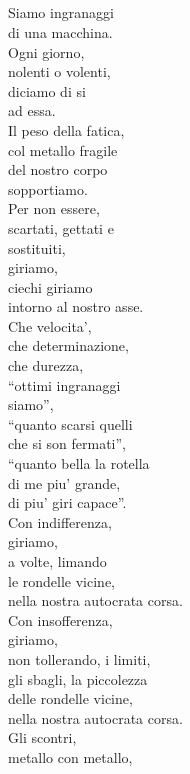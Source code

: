 \subsection*{}
\begin{haiku}
Siamo ingranaggi\\
di una macchina.\\
Ogni giorno,\\
nolenti o volenti,\\
diciamo di si\\
ad essa.\\
Il peso della fatica,\\
col metallo fragile\\
del nostro corpo\\
sopportiamo.\\
Per non essere,\\
scartati, gettati e\\
sostituiti,\\
giriamo,\\
ciechi giriamo\\
intorno al nostro asse.\\
Che velocita',\\
che determinazione,\\
che durezza,\\
``ottimi ingranaggi\\
siamo'',\\
``quanto scarsi quelli\\
che si son fermati'',\\
``quanto bella la rotella\\
di me piu' grande,\\
di piu' giri capace''.\\
Con indifferenza,\\
giriamo,\\
a volte, limando \\
le rondelle vicine,\\
nella nostra autocrata corsa.\\
Con insofferenza,\\
giriamo,\\
non tollerando, i limiti,\\
gli sbagli, la piccolezza\\
delle rondelle vicine,\\
nella nostra autocrata corsa.\\
Gli scontri,\\
metallo con metallo,\\

\end{haiku}
